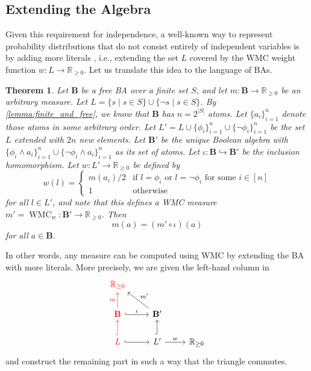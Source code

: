 \documentclass{article}
\newtheorem{theorem}{Theorem}
\theoremstyle{definition}
\theoremstyle{remark}
\DeclareMathOperator{\WMC}{WMC}
\begin{document}
\subsection{Extending the Algebra}


Given this requirement for independence, a well-known way to represent
probability distributions that do not consist entirely of independent variables
is by adding more literals \cite{DBLP:journals/ai/ChaviraD08}, i.e., extending
the set $L$ covered by the WMC weight function $w\colon L \to \mathbb{R}_{\ge
  0}$. Let us translate this idea to the language of BAs.

\begin{theorem} \label{thm:extension}
  Let $\mathbf{B}$ be a free BA over a finite set $S$, and let $m\colon
  \mathbf{B} \to \mathbb{R}_{\ge 0}$ be an arbitrary measure. Let $L = \{ s \mid
  s \in S \} \cup \{ \neg s \mid s \in S \}$. By \cref{lemma:finite_and_free},
  we know that $\mathbf{B}$ has $n = 2^{|S|}$ atoms. Let $\{a_i\}_{i=1}^n$
  denote those atoms in some arbitrary order. Let $L' = L \cup \{ \phi_i
  \}_{i=1}^n \cup \{\neg \phi_i \}_{i=1}^n$ be the set $L$ extended with $2n$
  new elements. Let $\mathbf{B'}$ be the unique Boolean algebra with $\{ \phi_i
  \land a_i \}_{i=1}^n \cup \{ \neg \phi_i \land a_i \}_{i=1}^n$ as its set of
  atoms. Let $\iota\colon \mathbf{B} \hookrightarrow \mathbf{B'}$ be the
  inclusion homomorphism. Let $w\colon L' \to \mathbb{R}_{\ge 0}$ be defined by
  \[
    w(l) = \begin{cases}
      m(a_i)/2 & \text{if } l = \phi_i \text{ or } l = \neg\phi_i \text{ for
        some } i \in [n] \\
      1 & \text{otherwise}
    \end{cases}
  \]
  for all $l \in L'$, and note that this defines a WMC measure $m' =
  \WMC_{w}\colon \mathbf{B'} \to \mathbb{R}_{\ge 0}$. Then
  \[
    m(a) = (m' \circ \iota)(a)
  \]
  for all $a \in \mathbf{B}$.
\end{theorem}

In other words, any measure can be computed using WMC by extending the BA with
more literals. More precisely, we are given the left-hand column in
\[
  \begin{tikzcd}
    \textcolor{red}{\mathbb{R}_{\ge 0}} & & \\
    \textcolor{red}{\mathbf{B}} \arrow[red]{u}{m} \ar[r,hookrightarrow,"\iota"]
    & \mathbf{B'} \arrow{lu}[swap]{m'} & \\
    \textcolor{red}{L} \ar[u,red,hookrightarrow] \ar[r,hookrightarrow] & L'
    \ar[u,hookrightarrow] \arrow{r}{w} & \mathbb{R}_{\ge 0}
  \end{tikzcd}
\]
and construct the remaining part in such a way that the triangle commutes.
\end{document}
